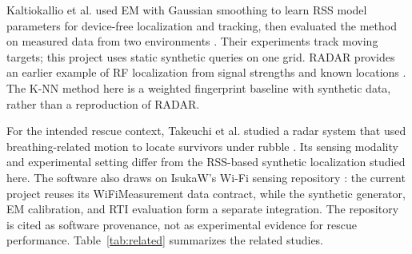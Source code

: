 \documentclass[sensors,article,submit,oneauthor]{Definitions/mdpi}
\begin{document}
Kaltiokallio et al. used EM with Gaussian smoothing to learn RSS model parameters for device-free localization and tracking, then evaluated the method on measured data from two environments \cite{Kaltiokallio2021}. Their experiments track moving targets; this project uses static synthetic queries on one grid. RADAR provides an earlier example of RF localization from signal strengths and known locations \cite{Bahl2000}. The K-NN method here is a weighted fingerprint baseline with synthetic data, rather than a reproduction of RADAR.

For the intended rescue context, Takeuchi et al. studied a radar system that used breathing-related motion to locate survivors under rubble \cite{Takeuchi2008}. Its sensing modality and experimental setting differ from the RSS-based synthetic localization studied here. The software also draws on IsukaW's Wi-Fi sensing repository \cite{IsukaW}: the current project reuses its WiFiMeasurement data contract, while the synthetic generator, EM calibration, and RTI evaluation form a separate integration. The repository is cited as software provenance, not as experimental evidence for rescue performance. Table~\ref{tab:related} summarizes the related studies.
\end{document}
